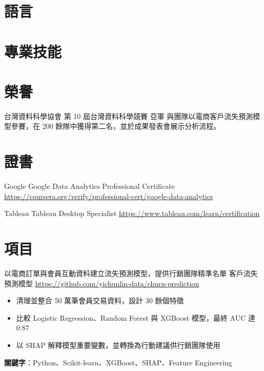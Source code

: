 \documentclass[a4paper, serif, 10pt]{moderncv}
\begin{document}
\section{語言}

\section{專業技能}

\section{榮譽}

        {台灣資料科學協會}
        {第 10 屆台灣資料科學競賽 亞軍}
        {}
        {}
        {與團隊以電商客戶流失預測模型參賽，在 200 餘隊中獲得第二名，並於成果發表會展示分析流程。}
\section{證書}

        {Google}
        {Google Data Analytics Professional Certificate}
        {\url{https://coursera.org/verify/professional-cert/google-data-analytics}}
        {}
        {}

        {Tableau}
        {Tableau Desktop Specialist}
        {\url{https://www.tableau.com/learn/certification}}
        {}
        {}
\section{項目}

        {以電商訂單與會員互動資料建立流失預測模型，提供行銷團隊精準名單}
        {客戶流失預測模型}
        {\url{https://github.com/yichunlin-data/churn-prediction}}
        {}
        {\begin{itemize}
\item 清理並整合 50 萬筆會員交易資料，設計 30 餘個特徵
\item 比較 Logistic Regression、Random Forest 與 XGBoost 模型，最終 AUC 達 0.87
\item 以 SHAP 解釋模型重要變數，並轉換為行動建議供行銷團隊使用
\end{itemize}
\textbf{關鍵字}：Python、Scikit-learn、XGBoost、SHAP、Feature Engineering}
\end{document}
